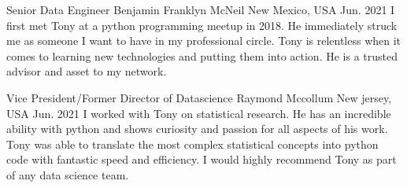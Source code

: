 

\begin{cventries}

  \cventry
    {Senior Data Engineer} %
    {Benjamin Franklyn McNeil} %
    {New Mexico, USA} %
    {Jun. 2021} %
    {
      I first met Tony at a python programming meetup in 2018. He immediately struck me as someone I want to have in my professional circle. Tony is relentless when it comes to learning new technologies and putting them into action. He is a trusted advisor and asset to my network.
    }

  \cventry
    {Vice President/Former Director of Datascience} %
    {Raymond Mccollum} %
    {New jersey, USA} %
    {Jun. 2021} %
    {
      I worked with Tony on statistical research. He has an incredible ability with python and shows curiosity and passion for all aspects of his work. Tony was able to translate the most complex statistical concepts into python code with fantastic speed and efficiency. I would highly recommend Tony as part of any data science team.
    }

\end{cventries}
